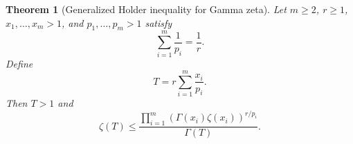 \documentclass[11pt]{article}
\numberwithin{equation}{section}
\newtheorem{theorem}{Theorem}[section]
\theoremstyle{definition}
\theoremstyle{remark}
\newcommand{\1}{\mathbf 1}
\begin{document}
\begin{theorem}[Generalized Holder inequality for Gamma zeta]
\label{thm:sroysang-holder}
Let \(m\ge2\), \(r\ge1\), \(x_1,\ldots,x_m>1\), and \(p_1,\ldots,p_m>1\) satisfy
\begin{equation}
\label{eq:sroysang-holder-condition}
\sum_{i=1}^{m}\frac1{p_i}=\frac1r.
\end{equation}
Define
\begin{equation}
\label{eq:sroysang-t}
T=r\sum_{i=1}^{m}\frac{x_i}{p_i}.
\end{equation}
Then \(T>1\) and
\begin{equation}
\label{eq:sroysang-generalized-holder}
\zeta(T)\le
\frac{\prod_{i=1}^{m}(\Gamma(x_i)\zeta(x_i))^{r/p_i}}{\Gamma(T)}.
\end{equation}
\end{theorem}
\end{document}
